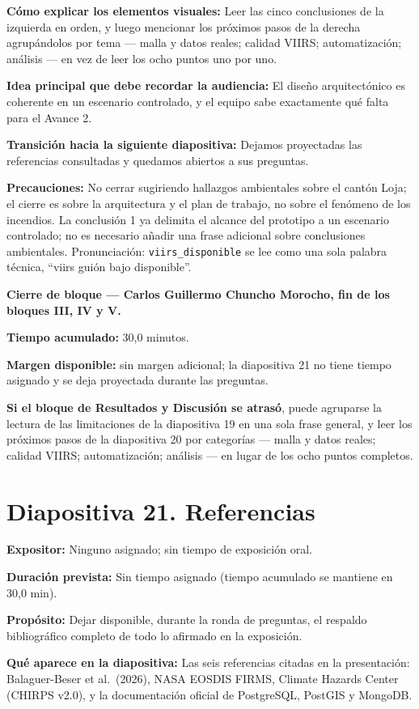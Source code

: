 \documentclass[11pt,a4paper]{article}
\newcommand{\campo}[2]{\par\medskip\noindent\textbf{#1:} #2\par}
\newenvironment{cierrebloque}[1]{%
  \begin{framed}\small\noindent\textbf{Cierre de bloque --- #1.}\par\smallskip
}{%
  \end{framed}\bigskip
}
\newcommand{\separadordiapositiva}{\bigskip\noindent{\color{Tierra!60}\hrulefill}\bigskip}
\begin{document}
\campo{C\'omo explicar los elementos visuales}{Leer las cinco
conclusiones de la izquierda en orden, y luego mencionar los pr\'oximos
pasos de la derecha agrup\'andolos por tema --- malla y datos reales;
calidad VIIRS; automatizaci\'on; an\'alisis --- en vez de leer los ocho
puntos uno por uno.}
\campo{Idea principal que debe recordar la audiencia}{El dise\~no
arquitect\'onico es coherente en un escenario controlado, y el equipo
sabe exactamente qu\'e falta para el Avance 2.}
\campo{Transici\'on hacia la siguiente diapositiva}{Dejamos proyectadas
las referencias consultadas y quedamos abiertos a sus preguntas.}
\campo{Precauciones}{No cerrar sugiriendo hallazgos ambientales sobre
el cant\'on Loja; el cierre es sobre la arquitectura y el plan de
trabajo, no sobre el fen\'omeno de los incendios. La conclusi\'on 1 ya
delimita el alcance del prototipo a un escenario controlado; no es
necesario a\~nadir una frase adicional sobre conclusiones ambientales.
Pronunciaci\'on: \texttt{viirs\_disponible} se lee como una sola
palabra t\'ecnica, ``viirs gui\'on bajo disponible''.}

\separadordiapositiva

\begin{cierrebloque}{Carlos Guillermo Chuncho Morocho, fin de los bloques III, IV y V}
\textbf{Tiempo acumulado:} 30,0 minutos.

\textbf{Margen disponible:} sin margen adicional; la diapositiva 21 no
tiene tiempo asignado y se deja proyectada durante las preguntas.

\textbf{Si el bloque de Resultados y Discusi\'on se atras\'o}, puede
agruparse la lectura de las limitaciones de la diapositiva 19 en una
sola frase general, y leer los pr\'oximos pasos de la diapositiva 20
por categor\'ias --- malla y datos reales; calidad VIIRS;
automatizaci\'on; an\'alisis --- en lugar de los ocho puntos completos.
\end{cierrebloque}

\section*{Diapositiva 21. Referencias}

\campo{Expositor}{Ninguno asignado; sin tiempo de exposici\'on oral.}
\campo{Duraci\'on prevista}{Sin tiempo asignado (tiempo acumulado se
mantiene en 30,0 min).}
\campo{Prop\'osito}{Dejar disponible, durante la ronda de preguntas, el
respaldo bibliogr\'afico completo de todo lo afirmado en la
exposici\'on.}
\campo{Qu\'e aparece en la diapositiva}{Las seis referencias citadas
en la presentaci\'on: Balaguer-Beser et al.\ (2026), NASA EOSDIS
FIRMS, Climate Hazards Center (CHIRPS v2.0), y la documentaci\'on
oficial de PostgreSQL, PostGIS y MongoDB.}
\end{document}
